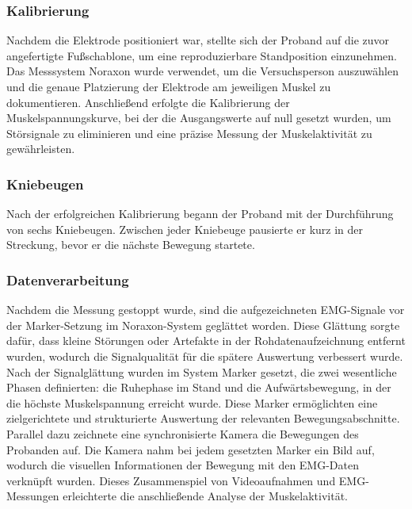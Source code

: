 \subsubsection{Kalibrierung}
Nachdem die Elektrode positioniert war, stellte sich der Proband auf die zuvor angefertigte Fußschablone, um eine reproduzierbare Standposition einzunehmen. Das Messsystem Noraxon wurde verwendet, um die Versuchsperson auszuwählen und die genaue Platzierung der Elektrode am jeweiligen Muskel zu dokumentieren. Anschließend erfolgte die Kalibrierung der Muskelspannungskurve, bei der die Ausgangswerte auf null gesetzt wurden, um Störsignale zu eliminieren und eine präzise Messung der Muskelaktivität zu gewährleisten.\\
\subsubsection{Kniebeugen}
Nach der erfolgreichen Kalibrierung begann der Proband mit der Durchführung von sechs Kniebeugen. Zwischen jeder Kniebeuge pausierte er kurz in der Streckung, bevor er die nächste Bewegung startete. 
\subsubsection{Datenverarbeitung}
Nachdem die Messung gestoppt wurde, sind die aufgezeichneten EMG-Signale vor der Marker-Setzung im Noraxon-System geglättet worden. Diese Glättung sorgte dafür, dass kleine Störungen oder Artefakte in der Rohdatenaufzeichnung entfernt wurden, wodurch die Signalqualität für die spätere Auswertung verbessert wurde.\\
Nach der Signalglättung wurden im System Marker gesetzt, die zwei wesentliche Phasen definierten: die Ruhephase im Stand und die Aufwärtsbewegung, in der die höchste Muskelspannung erreicht wurde. Diese Marker ermöglichten eine zielgerichtete und strukturierte Auswertung der relevanten Bewegungsabschnitte.
Parallel dazu zeichnete eine synchronisierte Kamera die Bewegungen des Probanden auf. Die Kamera nahm bei jedem gesetzten Marker ein Bild auf, wodurch die visuellen Informationen der Bewegung mit den EMG-Daten verknüpft wurden. Dieses Zusammenspiel von Videoaufnahmen und EMG-Messungen erleichterte die anschließende Analyse der Muskelaktivität.
